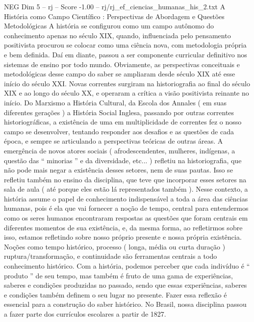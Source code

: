 \begin{textsample}{NEG Dim 5 – rj – Score -1.00 – rj/rj\_ef\_ciencias\_humanas\_his\_2.txt}  \label{ex:f5_neg_092}
A História como Campo Científico : Perspectivas de Abordagem e Questões Metodológicas A história se configurou como um campo autônomo do conhecimento apenas no século XIX, quando, influenciada pelo pensamento positivista procurou se colocar como uma ciência nova, com metodologia própria e bem definida.
Daí em diante, passou a ser componente curricular definitivo nos sistemas de ensino por todo mundo.
Obviamente, as perspectivas conceituais e metodológicas desse campo do saber se ampliaram desde século XIX até esse início do século XXI.
Novas correntes surgiram na historiografia ao final do século XIX e ao longo do século XX, e operaram a crítica a visão positivista reinante no início.
Do Marxismo a História Cultural, da Escola dos Annales ( em suas diferentes gerações ) a História Social Inglesa, passando por outras correntes historiográficas, a existência de uma em multiplicidade de correntes fez o nosso campo se desenvolver, tentando responder aos desafios e as questões de cada época, e sempre se articulando a perspectivas teóricas de outras áreas.
A emergência de novos atores sociais ( afrodescendentes, mulheres, indígenas, a questão das “ minorias ” e da diversidade, etc... ) refletiu na historiografia, que não pode mais negar a existência desses setores, nem de suas pautas.
Isso se refletiu também no ensino da disciplina, que teve que incorporar esses setores na sala de aula ( até porque eles estão lá representados também ).
Nesse contexto, a história assume o papel de conhecimento indispensável a toda a área das ciências humanas, pois é ela que vai fornecer a noção de tempo, central para entendermos como os seres humanos encontraram respostas as questões que foram centrais em diferentes momentos de sua existência, e, da mesma forma, ao refletirmos sobre isso, estamos refletindo sobre nosso próprio presente e nossa própria existência.
Noções como tempo histórico, processo ( longa, média ou curta duração ) ruptura/transformação, e continuidade são ferramentas centrais a todo conhecimento histórico.
Com a história, podemos perceber que cada indivíduo é “ produto ” de seu tempo, mas também é fruto de uma gama de experiências, saberes e condições produzidas no passado, sendo que essas experiências, saberes e condições também definem o seu lugar no presente.
Fazer essa reflexão é essencial para a construção do saber histórico.
No Brasil, nossa disciplina passou a fazer parte dos currículos escolares a partir de 1827.

\end{textsample}
